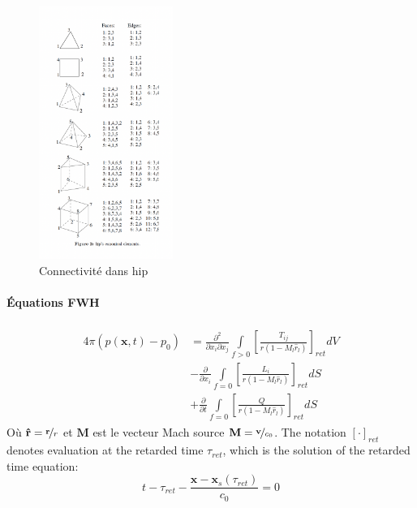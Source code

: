 \begin{figure}[H]
    \centering
    \includegraphics[width=0.39\textwidth]{images/Connectivite_hip.png}
    \caption{Connectivité dans hip}
    \label{fig:ordre_connect}
\end{figure}

\newpage

\renewcommand{\theequation}{A.\arabic{equation}}
\setcounter{equation}{5}


\paragraph{Équations FWH}

\begin{align}
    \label{eq:fwh-exact-solution-2}
    \begin{split}
    4 \pi \left( p \left( \mathbf{x}, t \right) - p_0 \right) &= \frac{\partial^2 }{\partial x_i \partial x_j} \int \limits_{f>0}^{} \left[ \frac{T_{ij}}{r \left( 1 - M_l \hat{r}_l \right)} \right]_{ret} dV \\
                                                              &- \frac{\partial }{\partial x_i} \int \limits_{f=0}^{} \left[ \frac{L_i}{r \left( 1 - M_l \hat{r}_l \right)} \right]_{ret} dS \\
                                                              &+ \frac{\partial }{\partial t} \int \limits_{f=0}^{} \left[ \frac{Q}{r \left( 1 - M_l \hat{r}_l \right)} \right]_{ret}  dS 
    \end{split}
  \end{align}
  Où $\mathbf{\hat{r}} = \nicefrac{\mathbf{r}}{r}$ et
  $\mathbf{M}$ est le vecteur Mach source $\mathbf{M} = \nicefrac{\mathbf{v}}{c_0}$.
  The notation $\left[ \cdot \right]_{ret}$ denotes evaluation at the
  retarded time $\tau_{ret}$, which is the solution of the retarded time
  equation:
  \begin{equation}
    \label{eq:retarded-time}
    t - \tau_{ret} - \frac{\mathbf{x} - \mathbf{x}_{s} \left( \tau_{ret} \right)}{c_0} = 0
  \end{equation}

